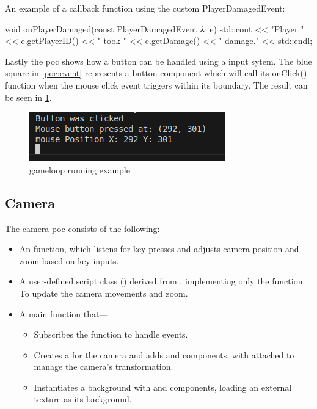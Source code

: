 \documentclass{projdoc}
\begin{document}
An example of a callback function using the custom PlayerDamagedEvent:\noparbreak
\begin{blockcode}
void onPlayerDamaged(const PlayerDamagedEvent & e) {
	std::cout << "Player " << e.getPlayerID() << " took " << e.getDamage()
				<< " damage." << std::endl;
}
\end{blockcode}

Lastly the \gls{poc} shows how a button can be handled using a input sytem. The blue
square in \cref{poc:event} represents a button component which will call its
onClick() function when the mouse click event triggers within its boundary. The
result can be seen in \cref{fig:poc-event-button}.

\begin{figure}
	\centering
	\includegraphics[scale=1]{img/poc-event-button.png}
	\caption{gameloop running example}
	\label{fig:poc-event-button}
\end{figure}

\subsection{Camera}
\label{poc:camera}

The camera \gls{poc} \autocite[camera example]{crepe:code-repo} consists of the
following:\noparbreak
\begin{itemize}
	\item An  function, which listens for key presses and
		adjusts camera position and zoom based on key inputs.
	\item A user-defined script class () derived from
		, implementing only the  function. To
		update the camera movements and zoom.
	\item A main function that---
		\begin{itemize}
			\item Subscribes the  function to handle
				 events.
			\item Creates a  for the camera and adds
				 and  components, with
				 attached to manage the camera's transformation.
			\item Instantiates a background  with
				 and  components, loading an
				external texture as its background.
		\end{itemize}
\end{itemize}
\end{document}
